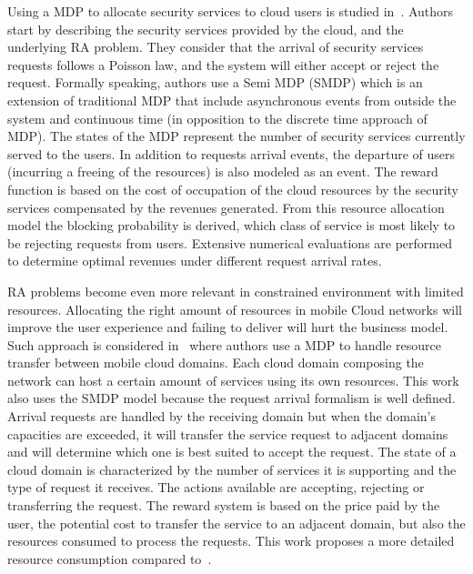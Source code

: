 Using a MDP to allocate security services to cloud users is studied in~\cite{Liang2011}.
Authors start by describing the security services provided by the cloud, and the underlying RA problem.
They consider that the arrival of security services requests follows a Poisson law, and the system will either accept or reject the request. Formally speaking, authors use a Semi MDP (SMDP) which is an extension of traditional MDP that include asynchronous events from outside the system and continuous time (in opposition to the discrete time approach of MDP).
The states of the MDP represent the number of security services currently served to the users. In addition to requests arrival events, the departure of users (incurring a freeing of the resources) is also modeled as an event. The reward function is based on the cost of occupation of the cloud resources by the security services compensated by the revenues generated. 
From this resource allocation model the blocking probability is derived, \ie which class of service is most likely to be rejecting requests from users. Extensive numerical evaluations are performed to determine optimal revenues under different request arrival rates.

RA problems become even more relevant in constrained environment with limited resources.
Allocating the right amount of resources in mobile Cloud networks will improve the user experience and failing to deliver will hurt the business model.
Such approach is considered in~\cite{Liang2012} where authors use a MDP to handle resource transfer between mobile cloud domains. Each cloud domain composing the network can host a certain amount of services using its own resources. 
This work also uses the SMDP model because the request arrival formalism is well defined.
Arrival requests are handled by the receiving domain but when the domain's capacities are exceeded, it will transfer the service request to adjacent domains and will determine which one is best suited to accept the request.
The state of a cloud domain is characterized by the number of services it is supporting and the type of request it receives.
The actions available are accepting, rejecting or transferring the request.
The reward system is based on the price paid by the user, the potential cost to transfer the service to an adjacent domain, but also the resources consumed to process the requests. 
This work proposes a more detailed resource consumption compared to~\cite{Liang2011}.


